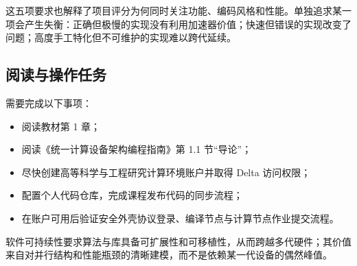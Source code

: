 这五项要求也解释了项目评分为何同时关注功能、编码风格和性能。单独追求某一项会产生失衡：正确但极慢的实现没有利用加速器价值；快速但错误的实现改变了问题；高度手工特化但不可维护的实现难以跨代延续。

\subsection{阅读与操作任务}

需要完成以下事项：
\begin{itemize}[itemsep=0.15em,parsep=0pt,topsep=0.3em]
  \item 阅读教材第 1 章；
  \item 阅读《统一计算设备架构编程指南》第 1.1 节“导论”；
  \item 尽快创建高等科学与工程研究计算环境账户并取得 Delta 访问权限；
  \item 配置个人代码仓库，完成课程发布代码的同步流程；
  \item 在账户可用后验证安全外壳协议登录、编译节点与计算节点作业提交流程。
\end{itemize}

\begin{keybox}
软件可持续性要求算法与库具备可扩展性和可移植性，从而跨越多代硬件；其价值来自对并行结构和性能瓶颈的清晰建模，而不是依赖某一代设备的偶然峰值。
\end{keybox}
